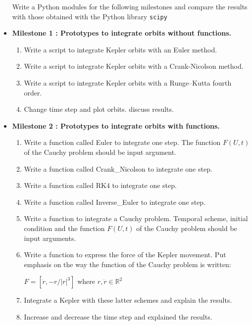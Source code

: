 \documentclass[12pt, a4paper]{article}
\begin{document}
\begin{itemize}
Write a Python modules for the following milestones and compare the results 
with those obtained with the Python library \texttt{scipy}


\item {\bf Milestone 1 : 
Prototypes to integrate orbits without functions.
  } 

\begin{enumerate} 
\item Write a script to integrate Kepler orbits with an Euler method. 
\item Write a script to integrate Kepler orbits with a Crank-Nicolson method. 
\item Write a script to integrate Kepler orbits with a Runge--Kutta fourth order.
\item Change time step and plot orbits. discuss results. 
 \end{enumerate} 



\newpage 
\item {\bf Milestone 2 : Prototypes to integrate orbits with functions. } 

\begin{enumerate} 
\item Write a function called Euler to integrate one step. 
The function  $F(U,t)$ of the Cauchy problem should be input argument.
\item Write a function called Crank\_Nicolson to integrate one step.
\item Write a function called RK4 to integrate one step.
\item Write a function called Inverse\_Euler to integrate one step.
\item Write a function to integrate a Cauchy problem. Temporal scheme, initial condition and 
the function $F(U,t)$ of the Cauchy problem should be input arguments.
\item Write a function to express the force of the Kepler movement.
Put emphasis on the way the function of the Cauchy problem is written: 

$ F = [ \dot r , -r/|r|^3 ] $ where $ r, \dot r \in \mathbb{R}^2 $ 

\item Integrate a Kepler with these latter schemes and explain the results.
\item Increase and decrease the time step and explained the results. 
 

\end{enumerate}
\end{itemize}
\end{document}
